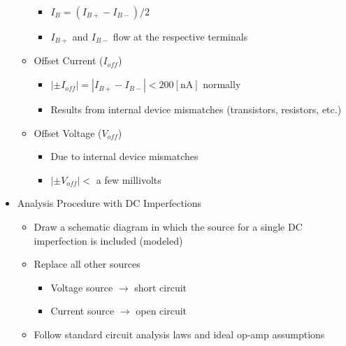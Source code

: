 \begin{itemize}
\begin{itemize}
\begin{itemize}
          \item $I_B=(I_{B+}-I_{B-})/2$

          \item $I_{B+}$ and $I_{B-}$ flow at the respective terminals

        \end{itemize}

      \item Offset Current ($I_{off}$)

        \begin{itemize}

          \item $|\pm I_{off}|=|I_{B+}-I_{B-}|<200[\si{\nano\ampere}]$ normally

          \item Results from internal device mismatches (transistors, resistors, etc.)

        \end{itemize}

      \item Offset Voltage ($V_{off}$)

        \begin{itemize}

          \item Due to internal device mismatches

          \item $|\pm V_{off}|<$ a few millivolts

        \end{itemize}

    \end{itemize}

  \item Analysis Procedure with DC Imperfections

    \begin{itemize}

      \item Draw a schematic diagram in which the source for a single DC imperfection is included (modeled)

      \item Replace all other sources

        \begin{itemize}

          \item Voltage source $\to$ short circuit

          \item Current source $\to$ open circuit

        \end{itemize}

      \item Follow standard circuit analysis laws and ideal op-amp assumptions

    \end{itemize}

\end{itemize}



